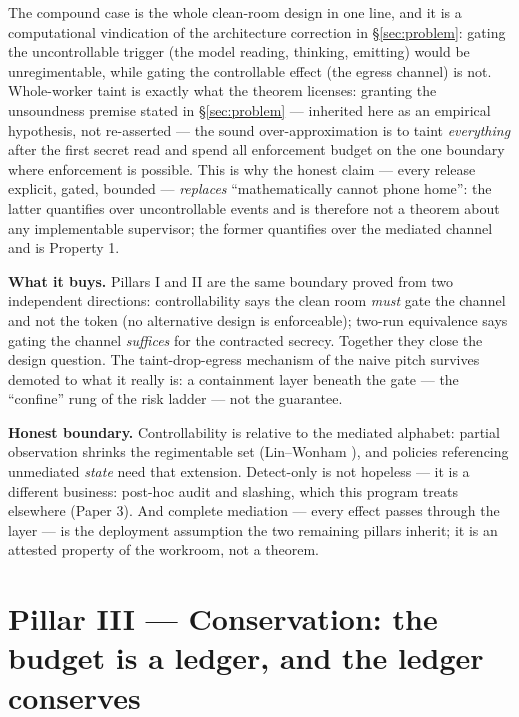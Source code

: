 \documentclass[11pt,a4paper]{article}
\begin{document}
The compound case is the whole clean-room design in one line, and it is a computational vindication of the architecture correction
in \S\ref{sec:problem}: gating the uncontrollable trigger (the model reading, thinking, emitting) would be unregimentable, while
gating the controllable effect (the egress channel) is not. Whole-worker taint is exactly what the theorem licenses: granting the unsoundness
premise stated in \S\ref{sec:problem} --- inherited here as an empirical hypothesis, not re-asserted --- the sound
over-approximation is to taint \emph{everything} after the
first secret read and spend all enforcement budget on the one boundary where enforcement is possible. This is why the honest claim
--- every release explicit, gated, bounded --- \emph{replaces} ``mathematically cannot phone home'': the latter quantifies over
uncontrollable events and is therefore not a theorem about any implementable supervisor; the former quantifies over the mediated
channel and is Property 1.

\textbf{What it buys.} Pillars I and II are the same boundary proved from two independent directions: controllability says the
clean room \emph{must} gate the channel and not the token (no alternative design is enforceable); two-run equivalence says gating
the channel \emph{suffices} for the contracted secrecy. Together they close the design question. The taint-drop-egress mechanism
of the naive pitch survives demoted to what it really is: a containment layer beneath the gate --- the ``confine'' rung of the
risk ladder --- not the guarantee.

\begin{boundary}
\textbf{Honest boundary.} Controllability is relative to the mediated alphabet: partial observation shrinks the regimentable set
(Lin--Wonham \cite{lin-wonham}), and policies referencing unmediated \emph{state} need that extension. Detect-only is not hopeless
--- it is a different business: post-hoc audit and slashing, which this program treats elsewhere (Paper 3). And complete mediation
--- every effect passes through the layer --- is the deployment assumption the two remaining pillars inherit; it is an attested
property of the workroom, not a theorem.
\end{boundary}

\section{Pillar III --- Conservation: the budget is a ledger, and the ledger conserves}\label{sec:p3}
\end{document}
